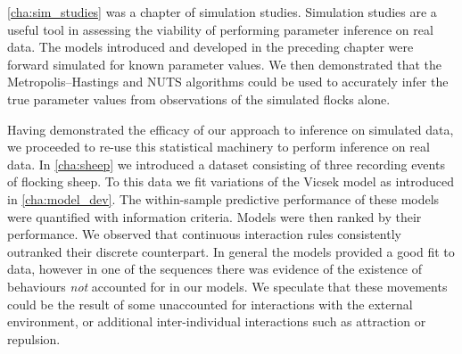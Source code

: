 \cref{cha:sim_studies} was a chapter of simulation studies. Simulation studies
are a useful tool in assessing the viability of performing parameter inference
on real data. The models introduced and developed in the preceding chapter
were forward simulated for known parameter values. We then demonstrated that
the Metropolis--Hastings and NUTS algorithms could be used to accurately infer
the true parameter values from observations of the simulated flocks alone.

Having demonstrated the efficacy of our approach to inference on simulated
data, we proceeded to re-use this statistical machinery to perform inference on
real data. In \cref{cha:sheep} we introduced a dataset consisting of three
recording events of flocking sheep. To this data we fit variations of the
Vicsek model as introduced in \cref{cha:model_dev}. The within-sample
predictive performance of these models were quantified with information
criteria. Models were then ranked by their performance. We observed that
continuous interaction rules consistently outranked their discrete counterpart.
In general the models provided a good fit to data, however in one of the
sequences there was evidence of the existence of behaviours \emph{not}
accounted for in our models. We speculate that these movements could be the
result of some unaccounted for interactions with the external environment, or
additional inter-individual interactions such as attraction or repulsion.









